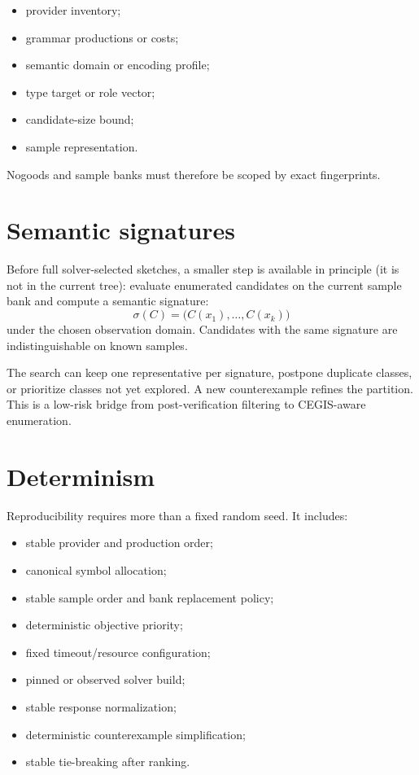 \documentclass[10pt,letterpaper,oneside]{report}
\begin{document}
\begin{itemize}
\item provider inventory;
\item grammar productions or costs;
\item semantic domain or encoding profile;
\item type target or role vector;
\item candidate-size bound;
\item sample representation.
\end{itemize}

Nogoods and sample banks must therefore be scoped by exact fingerprints.

\section{Semantic signatures}

Before full solver-selected sketches, a smaller step is available in principle (it is not in the current tree): evaluate enumerated candidates on the current sample bank and compute a semantic signature:
\[
  \sigma(C)=\bigl(C(x_1),\ldots,C(x_k)\bigr)
\]
under the chosen observation domain. Candidates with the same signature are indistinguishable on known samples.

The search can keep one representative per signature, postpone duplicate classes, or prioritize classes not yet explored. A new counterexample refines the partition. This is a low-risk bridge from post-verification filtering to CEGIS-aware enumeration.

\section{Determinism}

Reproducibility requires more than a fixed random seed. It includes:

\begin{itemize}
\item stable provider and production order;
\item canonical symbol allocation;
\item stable sample order and bank replacement policy;
\item deterministic objective priority;
\item fixed timeout/resource configuration;
\item pinned or observed solver build;
\item stable response normalization;
\item deterministic counterexample simplification;
\item stable tie-breaking after ranking.
\end{itemize}
\end{document}

